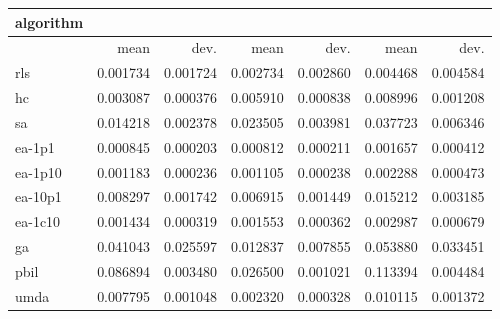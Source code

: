 \begin{tabular}{@{}l*{6}{>{{}}N{1}{2}}@{}}
\toprule
{algorithm} &  &  &  \\
\midrule
& {mean} & {dev.} & {mean} & {dev.} & {mean} & {dev.} \\
\midrule
rls & 0.001734 & 0.001724 & 0.002734 & 0.002860 & 0.004468 & 0.004584 \\
 hc & 0.003087 & 0.000376 & 0.005910 & 0.000838 & 0.008996 & 0.001208 \\
 sa & 0.014218 & 0.002378 & 0.023505 & 0.003981 & 0.037723 & 0.006346 \\
 ea-1p1 & 0.000845 & 0.000203 & 0.000812 & 0.000211 & 0.001657 & 0.000412 \\
 ea-1p10 & 0.001183 & 0.000236 & 0.001105 & 0.000238 & 0.002288 & 0.000473 \\
 ea-10p1 & 0.008297 & 0.001742 & 0.006915 & 0.001449 & 0.015212 & 0.003185 \\
 ea-1c10 & 0.001434 & 0.000319 & 0.001553 & 0.000362 & 0.002987 & 0.000679 \\
 ga & 0.041043 & 0.025597 & 0.012837 & 0.007855 & 0.053880 & 0.033451 \\
 pbil & 0.086894 & 0.003480 & 0.026500 & 0.001021 & 0.113394 & 0.004484 \\
 umda & 0.007795 & 0.001048 & 0.002320 & 0.000328 & 0.010115 & 0.001372 \\
 \bottomrule
\end{tabular}
